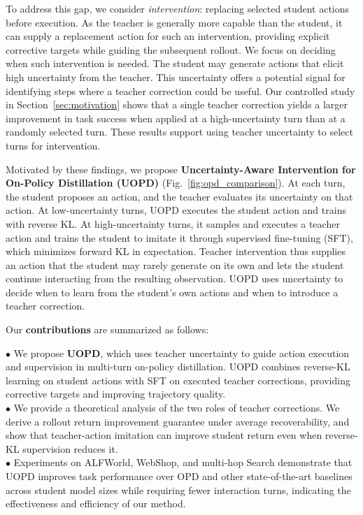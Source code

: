   To address this gap, we consider \textit{intervention}: replacing selected student actions before execution. As the teacher is generally more capable than the student, it can supply a replacement action for such an intervention, providing explicit corrective targets while guiding the subsequent rollout. We focus on deciding when such intervention is needed. The student may generate actions that elicit high uncertainty from the teacher. This uncertainty offers a potential signal for identifying steps where a teacher correction could be useful.   Our controlled study in Section~\ref{sec:motivation} shows that a single
  teacher correction yields a larger improvement in task success when
  applied at a high-uncertainty turn than at a randomly selected turn.
  These results support using teacher uncertainty to select turns
  for intervention.

Motivated by these findings, we propose \textbf{Uncertainty-Aware Intervention for On-Policy Distillation (UOPD)} (Fig.~\ref{fig:opd_comparison}). At each turn, the student proposes an action, and the teacher evaluates its uncertainty on that action. At low-uncertainty turns, UOPD executes the student action and trains with reverse KL. At high-uncertainty turns, it samples and executes a teacher action and trains the student to imitate it through supervised fine-tuning (SFT), which minimizes forward KL in expectation. Teacher intervention thus supplies an action that the student may rarely generate on its own and lets the student continue interacting from the resulting observation. UOPD uses uncertainty to decide when to learn from the student's own actions and when to introduce a teacher correction.

Our \textbf{contributions} are summarized as follows:

$\bullet$  We propose \textbf{UOPD}, which uses teacher uncertainty to guide
  action execution and supervision in multi-turn on-policy distillation.
  UOPD combines reverse-KL learning on student actions with SFT on executed
  teacher corrections, providing corrective targets and improving
  trajectory quality.\\
$\bullet$ We provide a theoretical analysis of the two roles of teacher corrections.
We derive a rollout return improvement guarantee under average recoverability,
and show that teacher-action imitation can improve student return even when
reverse-KL supervision reduces it.\\
$\bullet$  Experiments on ALFWorld, WebShop, and multi-hop Search demonstrate that UOPD improves task performance over OPD and other state-of-the-art baselines across student model sizes while requiring fewer interaction turns, indicating the effectiveness and efficiency of our method.